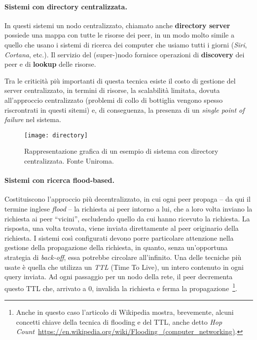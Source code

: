 \paragraph{Sistemi con directory centralizzata.} In questi sistemi un nodo
centralizzato, chiamato anche \textbf{directory server} possiede una mappa con
tutte le risorse dei peer, in un modo molto simile a quello che usano i sistemi
di ricerca dei computer che usiamo tutti i giorni (\textit{Siri},
\textit{Cortana}, etc.). Il servizio del (super-)nodo fornisce operazioni di
\textbf{discovery} dei peer e di \textbf{lookup} delle risorse.

Tra le criticità più importanti di questa tecnica esiste il costo di gestione
del server centralizzato, in termini di risorse, la scalabilità limitata, dovuta
all'approccio centralizzato (problemi di collo di bottiglia vengono spesso
riscrontrati in questi sitemi) e, di conseguenza, la presenza di un
\textit{single point of failure} nel sistema.

\begin{figure}[H]
 \centering
 \texttt{[image: directory]}
 \caption{Rappresentazione grafica di un esempio di sistema con
  directory centralizzata. Fonte Uniroma.}
\end{figure}

\paragraph{Sistemi con ricerca flood-based.} Costituiscono l'approccio più
decentralizzato, in cui ogni peer propaga -- da qui il termine inglese
\textit{flood} -- la richiesta ai peer intorno a lui, che a loro volta inviano
la richiesta ai peer ``vicini'', escludendo  quello da cui hanno ricevuto la
richiesta. La risposta, una volta trovata, viene inviata direttamente al peer
originario della richiesta. I sistemi così configurati devono porre particolare
attenzione nella gestione della propagazione della richiesta, in quanto, senza
un'opportuna strategia di \textit{back-off}, essa potrebbe circolare
all'infinito. Una delle tecniche più usate è quella che utilizza un \textit{TTL}
(Time To Live), un intero contenuto in ogni query inviata. Ad ogni passaggio per
un nodo della rete, il peer decrementa questo TTL che, arrivato a 0, invalida la
richiesta e ferma la propagazione~\footnote{Anche in questo caso l'articolo di
Wikipedia mostra, brevemente, alcuni concetti chiave della tecnica di flooding e
del TTL, anche detto \textit{Hop
Count}~\url{https://en.wikipedia.org/wiki/Flooding_(computer_networking)}.}.

